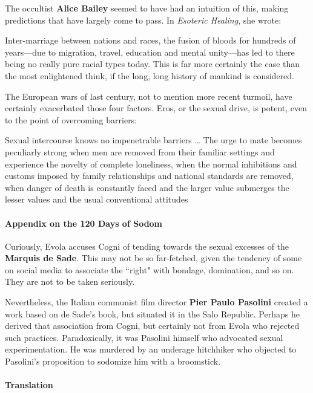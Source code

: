 The occultist \textbf{Alice Bailey }seemed to have had an intuition of this, making predictions that have largely come to pass. In \emph{Esoteric Healing}, she wrote:

\begin{quotex}
Inter-marriage between nations and races, the fusion of bloods for hundreds of years—due to migration, travel, education and mental unity—has led to there being no really pure racial types today. This is far more certainly the case than the most enlightened think, if the long, long history of mankind is considered. 

\end{quotex}
The European wars of last century, not to mention more recent turmoil, have certainly exacerbated those four factors. Eros, or the sexual drive, is potent, even to the point of overcoming barriers:

\begin{quotex}
Sexual intercourse knows no impenetrable barriers … The urge to mate becomes peculiarly strong when men are removed from their familiar settings and experience the novelty of complete loneliness, when the normal inhibitions and customs imposed by family relationships and national standards are removed, when danger of death is constantly faced and the larger value submerges the lesser values and the usual conventional attitudes 

\end{quotex}
\paragraph{Appendix on the 120 Days of Sodom}
Curiously, Evola accuses Cogni of tending towards the sexual excesses of the \textbf{Marquis de Sade}. This may not be so far-fetched, given the tendency of some on social media to associate the ``right" with bondage, domination, and so on. They are not to be taken seriously.

Nevertheless, the Italian communist film director \textbf{Pier Paulo Pasolini} created a work based on de Sade's book, but situated it in the Salo Republic. Perhaps he derived that association from Cogni, but certainly not from Evola who rejected such practices. Paradoxically, it was Pasolini himself who advocated sexual experimentation. He was murdered by an underage hitchhiker who objected to Pasolini's proposition to sodomize him with a broomstick.

\paragraph{Translation}

